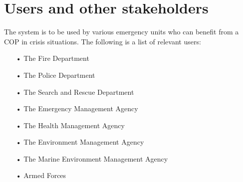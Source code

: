 \chapter{Users and other stakeholders}
The system is to be used by various emergency units who can benefit from a COP in crisis situations. The following is a list of relevant users:

\begin{enumerate}
\item[•] The Fire Department
\item[•] The Police Department
\item[•] The Search and Rescue Department
\item[•] The Emergency Management Agency
\item[•] The Health Management Agency
\item[•] The Environment Management Agency
\item[•] The Marine Environment Management Agency
\item[•] Armed Forces
\end{enumerate}

